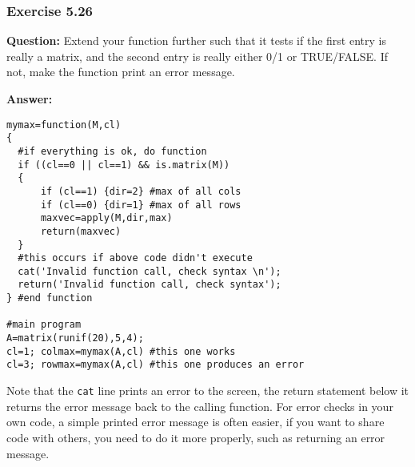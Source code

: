 \documentclass [11pt]{article}
\newcommand{\code}[1]{{\tt #1}}
\begin{document}
\newpage
\subsubsection*{Exercise 5.26}
\textbf{Question:} Extend your function further such that it tests if the first entry is really a matrix, and the second entry is really either 0/1 or TRUE/FALSE. If not, make the function print an error message.


\textbf{Answer:}
\begin{verbatim}
mymax=function(M,cl)
{
  #if everything is ok, do function
  if ((cl==0 || cl==1) && is.matrix(M)) 
  {
      if (cl==1) {dir=2} #max of all cols 
      if (cl==0) {dir=1} #max of all rows
      maxvec=apply(M,dir,max) 
      return(maxvec)
  }
  #this occurs if above code didn't execute
  cat('Invalid function call, check syntax \n');
  return('Invalid function call, check syntax');
} #end function

#main program
A=matrix(runif(20),5,4); 
cl=1; colmax=mymax(A,cl) #this one works
cl=3; rowmax=mymax(A,cl) #this one produces an error
\end{verbatim}
Note that the \code{cat} line prints an error to the screen, the return statement below it returns the error message back to the calling function. For error checks in your own code, a simple printed error message is often easier, if you want to share code with others, you need to do it more properly, such as returning an error message.
\end{document}
